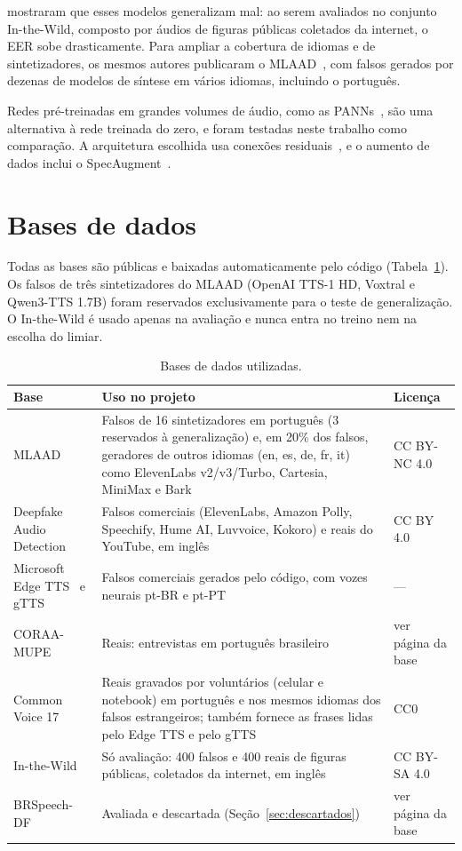 \citet{muller2022itw} mostraram que esses modelos generalizam mal: ao serem avaliados no conjunto In-the-Wild, composto por áudios de figuras públicas coletados da internet, o EER sobe drasticamente. Para ampliar a cobertura de idiomas e de sintetizadores, os mesmos autores publicaram o MLAAD~\citep{muller2024mlaad}, com falsos gerados por dezenas de modelos de síntese em vários idiomas, incluindo o português.

Redes pré-treinadas em grandes volumes de áudio, como as PANNs~\citep{kong2020panns}, são uma alternativa à rede treinada do zero, e foram testadas neste trabalho como comparação. A arquitetura escolhida usa conexões residuais~\citep{he2016resnet}, e o aumento de dados inclui o SpecAugment~\citep{park2019specaugment}.


\section{Bases de dados}
\label{sec:dados}

Todas as bases são públicas e baixadas automaticamente pelo código (Tabela~\ref{tab:bases}). Os falsos de três sintetizadores do MLAAD (OpenAI TTS-1 HD, Voxtral e Qwen3-TTS 1.7B) foram reservados exclusivamente para o teste de generalização. O In-the-Wild é usado apenas na avaliação e nunca entra no treino nem na escolha do limiar.

\begin{table}[!ht]
\caption{Bases de dados utilizadas.}
\centering
\small
\begin{tabular}{@{}p{3.3cm}p{9.0cm}p{3.2cm}@{}}
\hline\hline
Base & Uso no projeto & Licença \\
\hline
MLAAD~\citep{muller2024mlaad} & Falsos de 16 sintetizadores em português (3 reservados à generalização) e, em 20\% dos falsos, geradores de outros idiomas (en, es, de, fr, it) como ElevenLabs v2/v3/Turbo, Cartesia, MiniMax e Bark & CC BY-NC 4.0 \\
Deepfake Audio Detection~\citep{stafford2024deepfake} & Falsos comerciais (ElevenLabs, Amazon Polly, Speechify, Hume AI, Luvvoice, Kokoro) e reais do YouTube, em inglês & CC BY 4.0 \\
Microsoft Edge TTS~\citep{edgetts} e gTTS~\citep{gtts} & Falsos comerciais gerados pelo código, com vozes neurais pt-BR e pt-PT & --- \\
CORAA-MUPE~\citep{coraamupe} & Reais: entrevistas em português brasileiro & ver página da base \\
Common Voice 17~\citep{ardila2020commonvoice,commonvoice17hf} & Reais gravados por voluntários (celular e notebook) em português e nos mesmos idiomas dos falsos estrangeiros; também fornece as frases lidas pelo Edge TTS e pelo gTTS & CC0 \\
In-the-Wild~\citep{muller2022itw} & Só avaliação: 400 falsos e 400 reais de figuras públicas, coletados da internet, em inglês & CC BY-SA 4.0 \\
BRSpeech-DF~\citep{brspeechdf} & Avaliada e descartada (Seção~\ref{sec:descartados}) & ver página da base \\
\hline\hline
\end{tabular}
\label{tab:bases}
\end{table}

